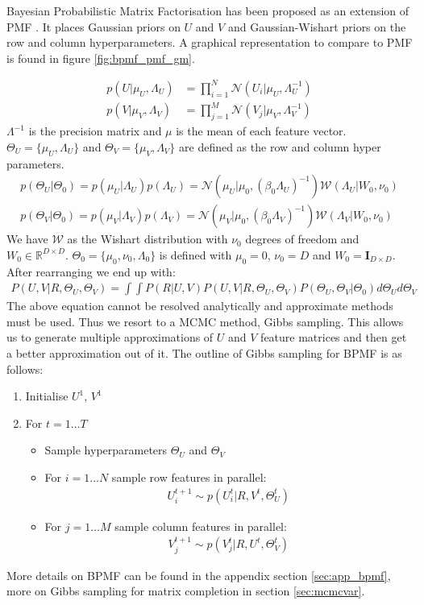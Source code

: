 Bayesian Probabilistic Matrix Factorisation has been proposed as an extension of PMF \cite{SalMnih2008}. It places Gaussian priors on $U$ and $V$ and Gaussian-Wishart priors on the row and column hyperparameters. A graphical representation to compare to PMF is found in figure \ref{fig:bpmf_pmf_gm}.

\begin{align*}
p(U|\mu_U,\Lambda_U) &= \prod\limits_{i=1}^{N} \mathcal{N}(U_i|\mu_U,\Lambda_U^{-1})\\
p(V|\mu_V,\Lambda_V) &= \prod\limits_{j=1}^{M} \mathcal{N}(V_j|\mu_V,\Lambda_V^{-1})
\end{align*}
$\Lambda^{-1}$ is the precision matrix and $\mu$ is the mean of each feature vector. $\Theta_U=\{\mu_U,\Lambda_U\}$ and $\Theta_V=\{\mu_V,\Lambda_V\}$ are defined as the row and column hyper parameters.
\begin{align*}
p(\Theta_U|\Theta_0) = p(\mu_U|\Lambda_U)p(\Lambda_U)= \mathcal{N}(\mu_U|\mu_0,(\beta_0 \Lambda_U)^{-1})\mathcal{W}(\Lambda_U|W_0, \nu_0) \\
p(\Theta_V|\Theta_0) = p(\mu_V|\Lambda_V)p(\Lambda_V)= \mathcal{N}(\mu_V|\mu_0,(\beta_0 \Lambda_V)^{-1})\mathcal{W}(\Lambda_V|W_0, \nu_0)
\end{align*}
We have $\mathcal{W}$ as the Wishart distribution with $\nu_0$ degrees of freedom and $W_0 \in \mathbb{R}^{D \times D}$. $\Theta_0=\{\mu_0,\nu_0,\Lambda_0\}$ is defined with $\mu_0=0$, $\nu_0=D$ and $W_0=\mathbf{I}_{D\times D}$.
After rearranging we end up with:
\begin{align*}
P(U,V|R,\Theta_U,\Theta_V) =\int \int P(R | U,V) P(U,V | R,\Theta_U,\Theta_V) P(\Theta_U,\Theta_V | \Theta_0)d\Theta_U d\Theta_V
\end{align*}
The above equation cannot be resolved analytically and approximate methods must be used. Thus we resort to a MCMC method, Gibbs sampling. This allows us to generate multiple approximations of $U$ and $V$ feature matrices and then get a better approximation out of it.
The outline of Gibbs sampling for BPMF is as follows:
\begin{enumerate}
  \item Initialise $U^1$, $V^1$
  \item For $t=1\dots T$
	\begin{itemize}
	  \item Sample hyperparameters $\Theta_U$ and $\Theta_V$
	  \item For $i=1 \dots N$ sample row features in parallel:
	  \begin{align*}
	  U_i^{t+1} \sim p(U_i^t|R, V^t ,\Theta_U^t)
	  \end{align*}
	  \item For $j=1 \dots M$ sample column features in parallel:
	  \begin{align*}
	  V_j^{t+1} \sim p(V_j^t|R, U^t ,\Theta_V^t)
	  \end{align*}
	\end{itemize}
\end{enumerate}
More details on BPMF can be found in the appendix section \ref{sec:app_bpmf}, more on Gibbs sampling for matrix completion in section \ref{sec:mcmcvar}.


